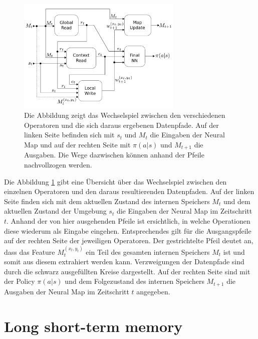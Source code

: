 \begin{figure}[ht!]
  \centering
  \includegraphics[keepaspectratio,width=0.7\textwidth]{abbildungen/neural_map.pdf}
  \caption{Die Abbildung zeigt das Wechselspiel zwischen den verschiedenen Operatoren und die sich daraus ergebenen Datenpfade. Auf der linken Seite befinden sich mit $s_t$ und $M_t$ die Eingaben der Neural Map und auf der rechten Seite mit $\pi(a|s)$ und $M_{t+1}$ die Ausgaben. Die Wege dazwischen können anhand der Pfeile nachvollzogen werden.}
  \label{fig_neural_map}
\end{figure}


Die Abbildung \ref{fig_neural_map} gibt eine Übersicht über das Wechselspiel zwischen den einzelnen Operatoren und den daraus resultierenden Datenpfaden. Auf der linken Seite finden sich mit dem aktuellen Zustand des internen Speichers $M_t$ und dem aktuellen Zustand der Umgebung $s_t$ die Eingaben der Neural Map im Zeitschritt $t$. Anhand der von hier ausgehenden Pfeile ist ersichtlich, in welche Operationen diese wiederum als Eingabe eingehen. Entsprechendes gilt für die Ausgangspfeile auf der rechten Seite der jeweiligen Operatoren. Der gestrichtelte Pfeil deutet an, dass das Feature $M_t^{(x_t,y_t)}$ ein Teil des gesamten internen Speichers $M_t$ ist und somit aus diesem extrahiert werden kann. Verzweigungen der Datenpfade sind durch die schwarz ausgefüllten Kreise dargestellt. Auf der rechten Seite sind mit der Policy $\pi(a|s)$ und dem Folgezustand des internen Speichers $M_{t+1}$ die Ausgaben der Neural Map im Zeitschritt $t$ angegeben.


\section{Long short-term memory}
\label{sec_lstm}

